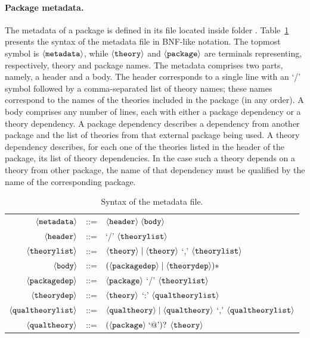 \paragraph{Package metadata.} The metadata of a package is defined
in its  file located inside folder
. Table~\ref{tab.bnf} presents the syntax of the metadata
file in BNF-like notation. The topmost symbol is
$\langle{\texttt{metadata}}\rangle$, while $\langle{\texttt{theory}}\rangle$ and
$\langle{\texttt{package}}\rangle$ are terminals representing, respectively,
theory and package names. The metadata comprises two parts, namely, a
header and a body. The header corresponds to a single line with an `/'
symbol followed by a comma-separated list of theory names; these names
correspond to the names of the theories included in the package (in
any order). A body comprises any number of lines, each with either a
package dependency or a theory dependency. A package dependency
describes a dependency from another package and the list of theories
from that external package being used. A theory dependency describes,
for each one of the theories listed in the header of the package, its
list of theory dependencies. In the case such a theory depends on a
theory from other package, the name of that dependency must be
qualified by the name of the corresponding package.


\begin{table}
  \centering
  \begin{tabular}{r c p{8cm}}
    \hline
    $\langle{\texttt{metadata}}\rangle$ & ::= & $\langle{\texttt{header}}\rangle \; \langle{\texttt{body}}\rangle$ \\
    $\langle{\texttt{header}}\rangle$ & ::= & `/' $\langle{\texttt{theorylist}}\rangle$ \\
    $\langle{\texttt{theorylist}}\rangle$ & ::= & $\langle{\texttt{theory}}\rangle \mid \langle{\texttt{theory}}\rangle$ `,' $\langle{\texttt{theorylist}}\rangle$ \\
    $\langle{\texttt{body}}\rangle$ & ::= & $(\langle{\texttt{packagedep}}\rangle \mid \langle{\texttt{theorydep}}\rangle)*$ \\
    $\langle{\texttt{packagedep}}\rangle$ & ::= & $\langle{\texttt{package}}\rangle$ `/' $\langle{\texttt{theorylist}}\rangle$ \\
    $\langle{\texttt{theorydep}}\rangle$ & ::= & $\langle{\texttt{theory}}\rangle$ `:' $\langle{\texttt{qualtheorylist}}\rangle$ \\
    $\langle{\texttt{qualtheorylist}}\rangle$ & ::= & $\langle{\texttt{qualtheory}}\rangle \mid \langle{\texttt{qualtheory}}\rangle$ `,' $\langle{\texttt{qualtheorylist}}\rangle$ \\
    $\langle{\texttt{qualtheory}}\rangle$ & ::= & $(\langle{\texttt{package}}\rangle\; \text{`@'})?$ $\langle{\texttt{theory}}\rangle$ \\
    \hline
  \end{tabular}
  \caption{Syntax of the  metadata file.}
  \label{tab.bnf}
\end{table}

